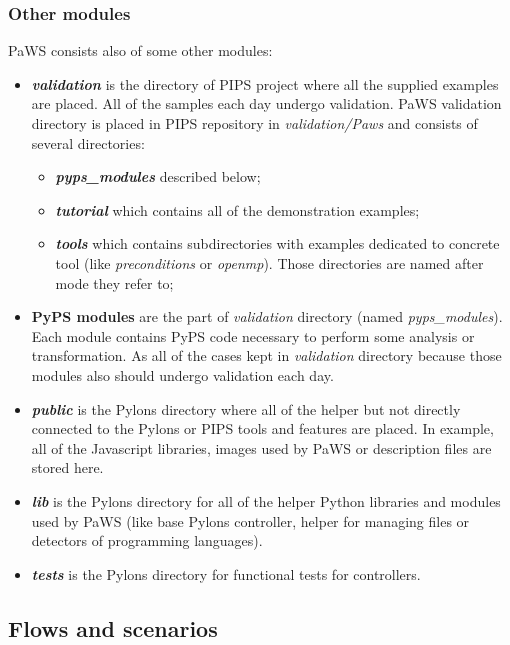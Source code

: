 \subsubsection{Other modules}
\label{other_modules}

PaWS consists also of some other modules:

\begin{itemize}
  \item {\bf \emph{validation}} is the directory of PIPS project where all the supplied examples are placed. All of the samples each day undergo validation. PaWS validation directory is placed in PIPS repository in \emph{validation/Paws} and consists of several directories:
  \begin{itemize}
    \item {\bf \emph{pyps\_modules}} described below;
    \item {\bf \emph{tutorial}} which contains all of the demonstration examples;
    \item {\bf \emph{tools}} which contains subdirectories with examples dedicated to concrete tool (like \emph{preconditions} or \emph{openmp}). Those directories are named after mode they refer to;
  \end{itemize}
  \item {\bf PyPS modules} are the part of \emph{validation} directory (named \emph{pyps\_modules}). Each module contains PyPS code necessary to perform some analysis or transformation. As all of the cases kept in \emph{validation} directory because those modules also should undergo validation each day.
  \item {\bf \emph{public}} is the Pylons directory where all of the helper but not directly connected to the Pylons or PIPS tools and features are placed. In example, all of the Javascript libraries, images used by PaWS or description files are stored here. 
  \item {\bf \emph{lib}} is the Pylons directory for all of the helper Python libraries and modules used by PaWS (like base Pylons controller, helper for managing files or detectors of programming languages).
  \item {\bf \emph{tests}} is the Pylons directory for functional tests for controllers.
\end{itemize}

\subsection{Flows and scenarios}

